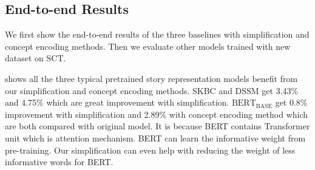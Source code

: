 \subsection{End-to-end Results}
\label{sec:result}

We first show the end-to-end results of the three baselines 
with simplification and concept encoding methods. Then we 
evaluate other models trained with new dataset on SCT.

\begin{table}[th]
 \small
\centering
{}
\caption{End-to-end accuracy on SCT test set with simplification and concept encoding methods. 
Original=baseline, Simp=simplification method, CE=concept encoding method
}
\label{tab:main}
\end{table}

 shows  all the three typical pretrained 
story representation models benefit from our simplification 
and concept encoding methods. 
SKBC and DSSM get 3.43\% and 4.75\% which are great improvement with simplification. 
$\text{BERT}_\text{BASE}$ get 0.8\% improvement with simplification and 
2.89\% with concept encoding method which are both compared with original model. 
It is because BERT contains Transformer unit which is attention mechanism. 
BERT can learn the informative weight from pre-training. Our simplification can even 
help with reducing the weight of less informative words for BERT. 


